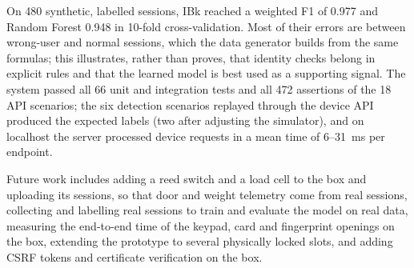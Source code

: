 \documentclass[conference, onecolumn]{IEEEtran}
\begin{document}
On 480 synthetic, labelled sessions, IBk reached a weighted F1 of 0.977 and Random Forest 0.948 in 10-fold
cross-validation. Most of their errors are between wrong-user and normal sessions, which the data generator builds from
the same formulas; this illustrates, rather than proves, that identity checks belong in explicit rules and that the
learned model is best used as a supporting signal. The system passed all 66 unit and integration tests and all 472
assertions of the 18 API scenarios; the six detection scenarios replayed through the device API produced
the expected labels (two after adjusting the simulator), and on localhost the server processed device requests in a
mean time of 6--31~ms per endpoint.

Future work includes adding a reed switch and a load cell to the box and uploading its sessions, so that door and
weight telemetry come from real sessions, collecting and labelling real sessions to train and evaluate the model on real data, measuring the
end-to-end time of the keypad, card and fingerprint openings on the box, extending the prototype to several physically locked slots, and adding CSRF
tokens and certificate verification on the box.



\end{document}
